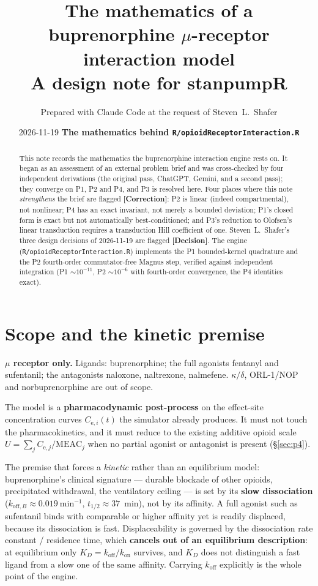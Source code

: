 \documentclass[11pt]{article}
\title{\textbf{The mathematics of a buprenorphine $\mu$-receptor interaction model}\\[0.3em]
\large A design note for stanpumpR}
\author{Prepared with Claude Code at the request of Steven~L.\ Shafer}
\date{2026-11-19 \quad\textbf{The mathematics behind \texttt{R/opioidReceptorInteraction.R}}}
\newcommand{\Cesub}[1]{C_{\mathrm{e},#1}}
\newcommand{\kon}[1][]{k_{\mathrm{on}#1}}
\newcommand{\koff}[1][]{k_{\mathrm{off}#1}}
\begin{document}
\maketitle

\begin{abstract}
\noindent
This note records the mathematics the buprenorphine interaction engine rests on.
It began as an assessment of an external problem brief and was cross-checked by
four independent derivations (the original pass, ChatGPT, Gemini, and a second
pass); they converge on P1, P2 and P4, and P3 is resolved here. Four places where
this note \emph{strengthens} the brief are flagged \textcolor{corrcol}{\textbf{[Correction]}}:
P2 is linear (indeed compartmental), not nonlinear; P4 has an exact invariant,
not merely a bounded deviation; P1's closed form is exact but not automatically
best-conditioned; and P3's reduction to Olofsen's linear transduction requires a
transduction Hill coefficient of one. Steven~L.\ Shafer's three design decisions
of 2026-11-19 are flagged \textcolor{deccol}{\textbf{[Decision]}}. The engine
(\texttt{R/opioidReceptorInteraction.R}) implements the P1 bounded-kernel
quadrature and the P2 fourth-order commutator-free Magnus step, verified against
independent integration (P1 $\sim\!10^{-11}$, P2 $\sim\!10^{-6}$ with fourth-order
convergence, the P4 identities exact).
\end{abstract}

\section{Scope and the kinetic premise}

\textbf{$\mu$ receptor only.} Ligands: buprenorphine; the full agonists
fentanyl and sufentanil; the antagonists naloxone, naltrexone, nalmefene.
$\kappa/\delta$, ORL-1/NOP and norbuprenorphine are out of scope.

The model is a \textbf{pharmacodynamic post-process} on the effect-site
concentration curves $\Cesub{i}(t)$ the simulator already produces. It must not
touch the pharmacokinetics, and it must reduce to the existing additive opioid
scale $U=\sum_j \Cesub{j}/\mathrm{MEAC}_j$ when no partial agonist or antagonist is
present (\S\ref{sec:p4}).

The premise that forces a \emph{kinetic} rather than an equilibrium model:
buprenorphine's clinical signature --- durable blockade of other opioids,
precipitated withdrawal, the ventilatory ceiling --- is set by its \textbf{slow
dissociation} ($\koff[,B]\approx 0.019~\mathrm{min^{-1}}$,
$t_{1/2}\approx 37$~min), not by its affinity. A full agonist such as
sufentanil binds with comparable or higher affinity yet is readily displaced,
because its dissociation is fast. Displaceability is governed by the
dissociation rate constant / residence time, which \textbf{cancels out of an
equilibrium description}: at equilibrium only $K_D=\koff/\kon$ survives, and
$K_D$ does not distinguish a fast ligand from a slow one of the same affinity.
Carrying $\koff$ explicitly is the whole point of the engine.
\end{document}
